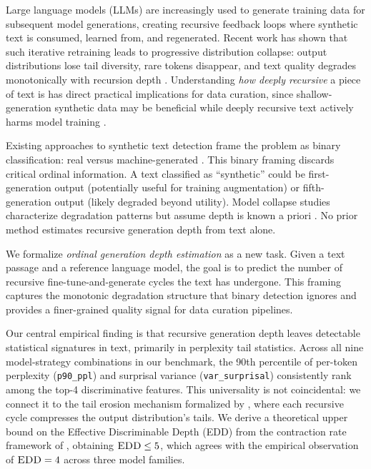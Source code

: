 \documentclass[11pt,a4paper]{article}
\newcommand{\edd}{\textsc{EDD}}
\begin{document}
Large language models (LLMs) are increasingly used to generate training data for subsequent model generations, creating recursive feedback loops where synthetic text is consumed, learned from, and regenerated. Recent work has shown that such iterative retraining leads to progressive distribution collapse: output distributions lose tail diversity, rare tokens disappear, and text quality degrades monotonically with recursion depth \citep{shumailov2024model,alemohammad2024selfconsuming,dohmatob2024tale}. Understanding \emph{how deeply recursive} a piece of text is has direct practical implications for data curation, since shallow-generation synthetic data may be beneficial while deeply recursive text actively harms model training \citep{gerstgrasser2024model}.

Existing approaches to synthetic text detection frame the problem as binary classification: real versus machine-generated \citep{hans2024binoculars,bao2024fastdetectgpt,liang2024monitoring}. This binary framing discards critical ordinal information. A text classified as ``synthetic'' could be first-generation output (potentially useful for training augmentation) or fifth-generation output (likely degraded beyond utility). Model collapse studies characterize degradation patterns but assume depth is known a priori \citep{drayson2025investigatinggeneralizabilitygenerationdegradation,shumailov2024model}. No prior method estimates recursive generation depth from text alone.

We formalize \emph{ordinal generation depth estimation} as a new task. Given a text passage and a reference language model, the goal is to predict the number of recursive fine-tune-and-generate cycles the text has undergone. This framing captures the monotonic degradation structure that binary detection ignores and provides a finer-grained quality signal for data curation pipelines.

Our central empirical finding is that recursive generation depth leaves detectable statistical signatures in text, primarily in perplexity tail statistics. Across all nine model-strategy combinations in our benchmark, the 90th percentile of per-token perplexity (\texttt{p90\_ppl}) and surprisal variance (\texttt{var\_surprisal}) consistently rank among the top-4 discriminative features. This universality is not coincidental: we connect it to the tail erosion mechanism formalized by \citet{shumailov2024model}, where each recursive cycle compresses the output distribution's tails. We derive a theoretical upper bound on the Effective Discriminable Depth (\edd) from the contraction rate framework of \citet{dohmatob2024tale}, obtaining $\edd \leq 5$, which agrees with the empirical observation of $\edd = 4$ across three model families.
\end{document}
